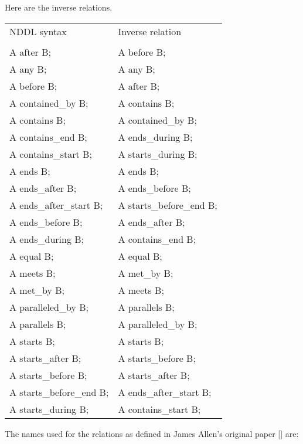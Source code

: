 \documentclass[10pt, letterpaper, twoside]{article}
\begin{document}
Here are the inverse relations.

\begin{tabular}{ll}
NDDL syntax & Inverse relation \\
\cline{1-2} \\
A after B; & A before B; \\
A any B; & A any B; \\
A before B; & A after B; \\
A contained\_by B; & A contains B; \\
A contains B; & A contained\_by B; \\
A contains\_end B; & A ends\_during B; \\
A contains\_start B; & A starts\_during B; \\
A ends B; & A ends B; \\
A ends\_after B; & A ends\_before B; \\
A ends\_after\_start B; & A starts\_before\_end B; \\
A ends\_before B; & A ends\_after B; \\
A ends\_during B; & A contains\_end B; \\
A equal B; & A equal B; \\
A meets B; & A met\_by B; \\
A met\_by B; & A meets B; \\
A paralleled\_by B; & A parallels B; \\
A parallels B; & A paralleled\_by B; \\
A starts B; & A starts B; \\
A starts\_after B; & A starts\_before B; \\
A starts\_before B; & A starts\_after B; \\
A starts\_before\_end B; & A ends\_after\_start B; \\
A starts\_during B; & A contains\_start B; \\
\end{tabular}

The names used for the relations as defined in James Allen's original
paper [] are:
\end{document}
